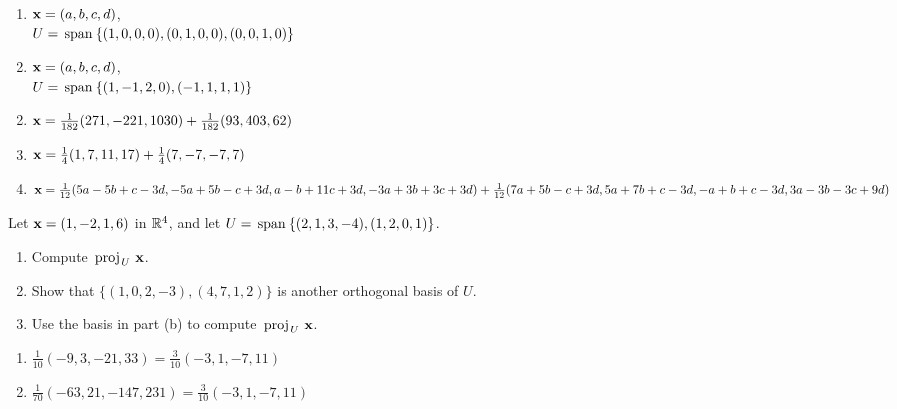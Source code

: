 \begin{multicols}{2}
\begin{ex}
\begin{enumerate}[label={\alph*.}, leftmargin=1em]
\item $\textbf{x} = (a, b, c, d)$, \\ $U = \thinspace\operatorname{span\medspace}\{(1, 0, 0, 0), (0, 1, 0, 0), (0, 0, 1, 0)\}$

\item $\textbf{x} = (a, b, c, d)$, \\ $U = \thinspace\operatorname{span\medspace}\{(1, -1, 2, 0), (-1, 1, 1, 1)\}$

\end{enumerate}
\begin{sol}
\begin{enumerate}[label={\alph*.}]
	
\setcounter{enumi}{1}
\item $\textbf{x} = \tfrac{1}{182}(271,-221,1030)  + \tfrac{1}{182}(93,403,62)$

\setcounter{enumi}{3}
\item $\textbf{x}= \tfrac{1}{4}(1, 7, 11, 17) + \tfrac{1}{4}(7, -7, -7, 7)$

\setcounter{enumi}{5}
\item $\textbf{x} = \tfrac{1}{12}(5a - 5b + c - 3d, -5a + 5b - c + 3d, a - b + 11c + 3d, -3a + 3b + 3c + 3d) + \tfrac{1}{12}(7a + 5b - c + 3d, 5a + 7b + c - 3d, -a + b + c -3d, 3a - 3b - 3c + 9d)$

\end{enumerate}
\end{sol}
\end{ex}

\begin{ex}
Let $\textbf{x} = (1, -2, 1, 6)$ in $\mathbb{R}^4$, and let $U = \thinspace\operatorname{span\medspace}\{(2, 1, 3, -4), (1, 2, 0, 1)\}$.


\begin{enumerate}[label={\alph*.}]
\item Compute $\thinspace\operatorname{proj\medspace}_{\!U}\,{\textbf{x}}$.

\item Show that $\{(1, 0, 2, -3), (4, 7, 1, 2)\}$ is another orthogonal basis of $U$.

\item Use the basis in part (b) to compute $\thinspace\operatorname{proj\medspace}_{\!U}\,{\textbf{x}}$.

\end{enumerate}
\begin{sol}
\begin{enumerate}[label={\alph*.}]
\item  $\frac{1}{10}(-9,3,-21,33) = \frac{3}{10}(-3,1,-7,11)$

\setcounter{enumi}{2}
\item  $\frac{1}{70}(-63,21,-147,231) = \frac{3}{10}(-3,1,-7,11)$


\end{enumerate}
\end{sol}
\end{ex}
\end{multicols}
